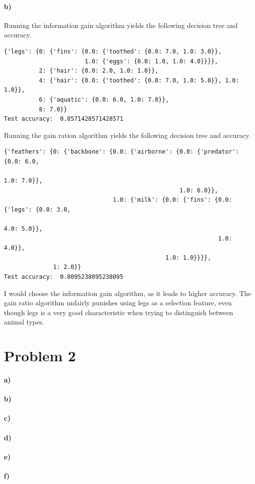 \documentclass[12pt]{article}
\begin{document}
\paragraph{b)}

Running the information gain algorithm yields the following decision tree and accuracy.
\scriptsize
\begin{verbatim}
{'legs': {0: {'fins': {0.0: {'toothed': {0.0: 7.0, 1.0: 3.0}},
                       1.0: {'eggs': {0.0: 1.0, 1.0: 4.0}}}},
          2: {'hair': {0.0: 2.0, 1.0: 1.0}},
          4: {'hair': {0.0: {'toothed': {0.0: 7.0, 1.0: 5.0}}, 1.0: 1.0}},
          6: {'aquatic': {0.0: 6.0, 1.0: 7.0}},
          8: 7.0}}
Test accuracy:  0.8571428571428571
\end{verbatim}
\normalsize
Running the gain ration algorithm yields the following decision tree and accuracy.
\scriptsize
\begin{verbatim}
{'feathers': {0: {'backbone': {0.0: {'airborne': {0.0: {'predator': {0.0: 6.0,
                                                                     1.0: 7.0}},
                                                  1.0: 6.0}},
                               1.0: {'milk': {0.0: {'fins': {0.0: {'legs': {0.0: 3.0,
                                                                            4.0: 5.0}},
                                                             1.0: 4.0}},
                                              1.0: 1.0}}}},
              1: 2.0}}
Test accuracy:  0.8095238095238095
\end{verbatim}
\normalsize
I would choose the information gain algorithm, as it leads to higher accuracy. The gain
ratio algorithm unfairly punishes using legs as a selection feature, even though legs
is a very good characteristic when trying to distinguish between animal types.

\section*{Problem 2}

\paragraph{a)}

\paragraph{b)}

\paragraph{c)}

\paragraph{d)}

\paragraph{e)}

\paragraph{f)}
\end{document}
